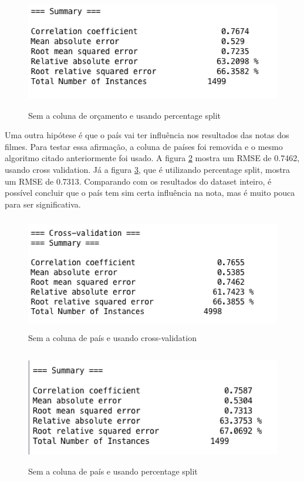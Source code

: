 \begin{figure}[H]
\centering
\includegraphics[height=5cm]{imagens/no_budget_split.png}
\caption{Sem a coluna de orçamento e usando percentage split}
\label{nobudgetsplit}
\end{figure}


Uma outra hipótese é que o país vai ter influência nos resultados das notas dos filmes. Para testar essa afirmação, a coluna de países foi removida e o mesmo algoritmo citado anteriormente foi usado. A figura \ref{nocountrycv} mostra um RMSE de 0.7462, usando cross validation. Já a figura \ref{nocountrysplit}, que é utilizando percentage split, mostra um RMSE de 0.7313. Comparando com os resultados do dataset inteiro, é possível concluir que o país tem sim certa influência na nota, mas é muito pouca para ser significativa. 

\begin{figure}[H]
\centering
\includegraphics[height=5cm]{imagens/no_country_cv.png}
\caption{Sem a coluna de país e usando cross-validation}
\label{nocountrycv}
\end{figure}

\begin{figure}[H]
\centering
\includegraphics[height=5cm]{imagens/no_country_split.png}
\caption{Sem a coluna de país e usando percentage split}
\label{nocountrysplit}
\end{figure}


